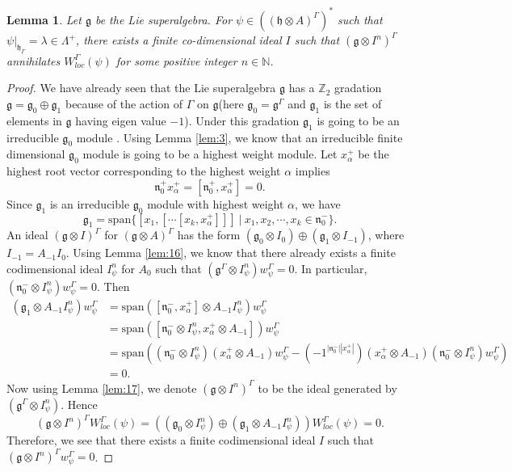 \documentclass[11pt]{amsart}
\theoremstyle{plain}
\newtheorem{lemma}[thm]{Lemma}
\theoremstyle{definition}
\newcommand{\g}{\mathfrak{g}}
\newcommand{\h}{\mathfrak{h}}
\newcommand{\n}{\mathfrak{n}}
\newcommand{\lw}{w_{\psi}^{\Gamma}}
\newcommand{\LW}{W_{loc}^{\Gamma}(\psi)}
\begin{document}
\begin{lemma}\label{lem:8.9}
Let $\g$ be the Lie superalgebra. For $\psi\in((\h\otimes A)^{\Gamma})^{*}$ such that $\psi|_{\h_{\Gamma}}=\lambda\in\Lambda^{+}$, there exists a finite co-dimensional ideal $I$ such that $(\g\otimes I^{n})^{\Gamma}$ annihilates $\LW$ for some positive integer $n\in\mathbb{N}$.
\end{lemma}
\begin{proof}
We have already seen that the Lie superalgebra $\g$ has a $\mathbb{Z}_{2}$ gradation $\g=\g_{0}\oplus\g_{1}$ because of the action of $\Gamma$ on $\g$(here $\g_{0}=\g^{\Gamma}$ and $\g_{1}$ is the set of elements in $\g$ having eigen value $-1$). Under this gradation $\g_{1}$ is going to be an irreducible $\g_{0}$ module \cite{vdL}. Using Lemma \ref{lem:3}, we know that an irreducible finite dimensional $\g_{0}$ module is going to be a highest weight module. Let $x^{+}_{\alpha}$ be the highest root vector corresponding to the highest weight $\alpha$ implies
\begin{equation*}
\n_{0}^{+}x_{\alpha}^{+}=[\n_{0}^{+},x_{\alpha}^{+}]=0.
\end{equation*}
Since $\g_{1}$ is an irreducible $\g_{0}$ module with highest weight $\alpha$, we have
\begin{equation*}
         \g_{1}=\mbox{span}\{[x_{1},[\cdots[x_{k},x_{\alpha}^{+}]]]~|~ x_{1},x_{2},\cdots, x_{k}\in\n_{0}^{-}\}.
\end{equation*}
An ideal $(\g\otimes I)^{\Gamma}$ for $(\g\otimes A)^{\Gamma}$ has the form $(\g_{0}\otimes I_{0})\oplus(\g_{1}\otimes I_{-1})$, where $I_{-1}=A_{-1}I_{0}$. Using Lemma \ref{lem:16}, we know that there already exists a finite codimensional ideal $I_{\psi}^{n}$ for $A_{0}$ such that $(\g^{\Gamma}\otimes I_{\psi}^{n})\lw=0$. In particular, $(\n_{0}^{-}\otimes I_{\psi}^{n})\lw=0$. Then
\begin{align*}
(\g_{1}\otimes A_{-1}I_{\psi}^{n})\lw &=\mbox{span}([\n_{0}^{-},x_{\alpha}^{+}]\otimes A_{-1}I_{\psi}^{n})\lw \\
&=\mbox{span}([\n_{0}^{-}\otimes I_{\psi}^{n},x_{\alpha}^{+}\otimes A_{-1}])\lw \\
&=\mbox{span}((\n_{0}^{-}\otimes I_{\psi}^{n})(x_{\alpha}^{+}\otimes A_{-1})\lw-(-1^{|\n_{0}^{-}||x_{\alpha}^{+}|})(x_{\alpha}^{+}\otimes A_{-1})(\n_{0}^{-}\otimes I_{\psi}^{n})\lw)\\
&=0.
\end{align*}
Now using Lemma  \ref{lem:17}, we denote $(\g\otimes I^{n})^{\Gamma}$ to be the ideal generated by $(\g^{\Gamma}\otimes I_{\psi}^{n})$. Hence \[(\g\otimes I^{n})^{\Gamma}\LW=((\g_{0}\otimes I_{\psi}^{n})\oplus(\g_{1}\otimes A_{-1}I_{\psi}^{n}))\LW=0.\]
Therefore, we see that there exists a finite codimensional ideal $I$ such that $(\g\otimes I^{n})^{\Gamma}\lw=0$.
\end{proof}
\end{document}
